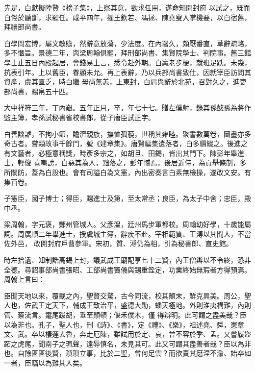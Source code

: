 \begin{pinyinscope}
 先是，白獻擬陸贄《榜子集》，上察其意，欲求任用，遂命知開封府
 以試之，既而白倦於聽斷，求罷任。咸平四年，擢王欽若、馮拯、陳堯叟入掌機要，以白宿舊，拜禮部尚書。



 白學問宏博，屬文敏贍，然辭意放蕩，少法度。在內署久，頗厭番直，草辭疏略，多不愜旨。景德二年，與梁周翰俱罷，拜刑部尚書、集賢院學士、判院事。舊三館學士止五日內殿起居，會錢易上言，悉令赴外朝。白羸老步梗，就班足跌。未幾，抗表引年。上以舊臣，眷顧未允。再上表辭，乃以兵部尚書致仕，因就宰臣訪問其資產，虞其匱乏，時白繼
 母尚無恙，上東封，白肩與辭於北苑，召對久之，進吏部尚書，賜帛五十匹。



 大中祥符三年，丁內艱。五年正月，卒，年七十七。贈左僕射，錄其孫懿孫為將作監主簿，孝孫試秘書省校書郎，從子唐臣試正字。



 白善談謔，不拘小節，贍濟親族，撫恤孤藐，世稱其雍睦。聚書數萬卷，圖畫亦多奇古者。嘗類故事千餘門，號《建章集》。唐賢編集遺落者，白多纘綴之。後進之有文藝者，必極意稱獎，時彥多宗之，如胡旦、田錫，皆出其門下。陳彭年舉進士，輕俊
 喜嘲謗，白惡其為人，黜落之，彭年憾焉，後居近侍，為貢舉條制，多所關防，蓋為白設也。會有司謚白為文憲，內出密奏言白素無檢操，遂改文安。有集百卷。



 子憲臣，國子博士；得臣，賜進士及第，至太常丞；良臣，為太子中舍；忠臣，殿中丞。



 梁周翰，字元褒，鄭州管城人。父彥溫，廷州馬步軍都校。周翰幼好學，十歲能屬詞。周廣順二年舉進士，授虞城主簿，辭疾不赴。宰相範質、王溥以其聞人，不當佐外邑，
 改開封府戶曹參軍。宋初，質、溥仍為相，引為秘書郎、直史館。



 時左拾遺、知制誥高錫上封，議武成王廟配享七十二賢，內王僧辯以不令終，恐非全德。尋詔事部尚書張昭、工部尚書竇儀與錫重銓定，功業終始無瑕者方得預焉。周翰上言曰：



 臣聞天地以來，覆載之內，聖賢交騖，古今同流，校其顛末，鮮克具美。周公，聖人也，佐武王定天下，輔成王致治平，盛德大勛，蟠天極地。外則淮夷構難，內則管、蔡流言。疐尾跋胡，垂至顛頓；偃禾僕木，僅
 得辨明。此可謂之盡美哉？臣以為非也。孔子，聖人也，刪《詩》、《書》，定《禮》、《樂》，祖述堯、舜，憲章文、武。卒以棲遲去魯，奔走厄陳，雖試用於定、哀，曾不容於季、孟。又嘗履盜跖之虎尾，聞南子之珮聲，遠辱慎名，未見其可。此又可謂其盡善者哉？臣以為非也。自餘區區後賢，瑣瑣立事，比於二聖，曾何足雲？而欲責其磨涅不渝、始卒如一者，臣竊以為難其人矣。




\end{pinyinscope}
